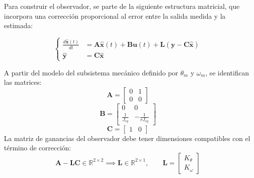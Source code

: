 \documentclass[blue,fullpaper]{ludusofficial}  %
\begin{document}
Para construir el observador, se parte de la siguiente estructura matricial, que incorpora una corrección proporcional al error entre la salida medida y la estimada:

\begin{equation}
\label{eq:estructura-observador}
\left\{
\begin{aligned}
\frac{d \mathbf{\hat{x}}(t) }{dt} & = \mathbf{A} \mathbf{\hat{x}}(t) + \mathbf{B}\mathbf{u}(t) + \mathbf{L}(\mathbf{y}-\mathbf{C}\mathbf{\hat{x}}) \\
\mathbf{\hat{y}} & = \mathbf{C} \mathbf{\hat{x}}
\end{aligned}
\right.
\end{equation}

A partir del modelo del subsistema mecánico definido por $\theta_{m}$ y $\omega_{m}$, se identifican las matrices:
\[
\mathbf{A}=\begin{bmatrix} 0 & 1 \\0 & 0 \end{bmatrix}
\]
\[
\mathbf{B} = \begin{bmatrix} 0 & 0 \\ \frac{1}{J_{eq}} & -\frac{1}{rJ_{eq}} \end{bmatrix}
\]
\[
\mathbf{C}=\begin{bmatrix} 1 & 0\end{bmatrix}
\]
La matriz de ganancias del observador debe tener dimensiones compatibles con el término de corrección:
\begin{equation}
\label{eq:ganancias-observador-vector}
\mathbf{A}-\mathbf{L}\mathbf{C} \in \mathbb{R}^{2\times2} \implies \mathbf{L} \in \mathbb{R}^{2\times1}, \qquad \mathbf{L}=\begin{bmatrix} K_{\theta} \\ K_{\omega} \end{bmatrix}
\end{equation}
\end{document}
